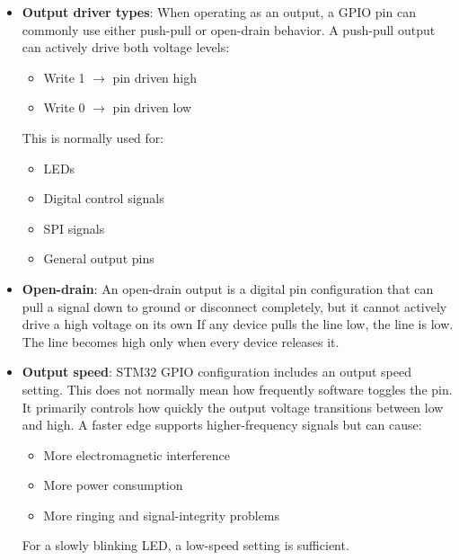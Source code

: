 \documentclass{report}
\begin{document}
\begin{itemize}
\begin{center}
            \end{center}
            Selecting the correct mode is essential. Writing an output value does not make a pin behave as an output if it is still configured as an input.
        \item \textbf{Output driver types}: When operating as an output, a GPIO pin can commonly use either push-pull or open-drain behavior.
            \bigbreak \noindent 
            A push-pull output can actively drive both voltage levels:
            \bigbreak \noindent 
            \begin{itemize}
                \item Write 1 $\to$ pin driven high
                \item Write 0 $\to$ pin driven low
            \end{itemize}
            This is normally used for:
            \begin{itemize}
                \item LEDs
                \item Digital control signals
                \item SPI signals
                \item General output pins
            \end{itemize}
        \item \textbf{Open-drain}: An open-drain output is a digital pin configuration that can pull a signal down to ground or disconnect completely, but it cannot actively drive a high voltage on its own
            \bigbreak \noindent 
            If any device pulls the line low, the line is low. The line becomes high only when every device releases it.
        \item \textbf{Output speed}: STM32 GPIO configuration includes an output speed setting. This does not normally mean how frequently software toggles the pin. It primarily controls how quickly the output voltage transitions between low and high.
            \bigbreak \noindent 
            A faster edge supports higher-frequency signals but can cause:
            \begin{itemize}
                \item More electromagnetic interference
                \item More power consumption
                \item More ringing and signal-integrity problems
            \end{itemize}
            For a slowly blinking LED, a low-speed setting is sufficient.

\end{itemize}
\end{document}

